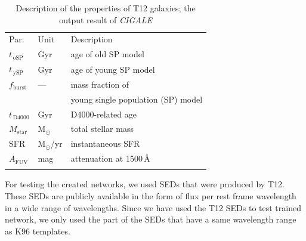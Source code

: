 \documentclass[useAMS,usenatbib]{mn2e}
\begin{document}
       
    \begin{table}
\caption[]{Description of the properties of T12 galaxies; the output result of {\em CIGALE}}     
\label{tab: props}
\centering
\begin{tabular}{l l l}
\hline\hline
\noalign{\smallskip}
Par. & Unit & Description\\
\noalign{\smallskip}
\hline
\noalign{\smallskip}
$t_{\,\mathrm{oSP}}$ & Gyr & age of old SP model \\
$t_{\,\mathrm{ySP}}$ & Gyr & age of young SP model \\
$f_\mathrm{burst}$ & --- & mass fraction of \\
& & young single population (SP) model \\
\noalign{\smallskip}
$t_{\,\mathrm{D4000}}$ & Gyr & D4000-related age \\
\noalign{\smallskip}
$M_\mathrm{star}$ & M$_\odot$ & total stellar mass  \\
SFR & M$_\odot$/yr & instantaneous SFR  \\
$A_\mathrm{FUV}$ & mag & attenuation at 1500\,\AA{} \\
\noalign{\smallskip}
\hline
\end{tabular}
\end{table}

    For testing the created networks, we used SEDs that were produced by T12. 
    These SEDs are publicly available in the form of flux per rest frame wavelength in a wide range of wavelengths.
    Since we have used the T12 SEDs to test trained network, we only used the part of the SEDs that have a same wavelength range as K96 templates.  
 
\end{document}
